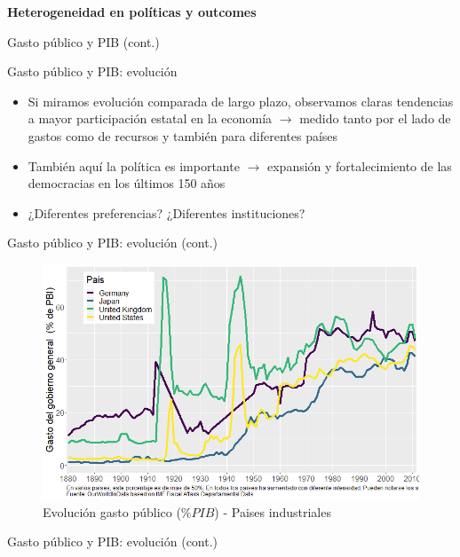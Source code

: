 \documentclass[
  ignorenonframetext,
]{beamer}
\providecommand{\tightlist}{%
  \setlength{\itemsep}{0pt}\setlength{\parskip}{0pt}}\usepackage{longtable,booktabs,array}
\begin{document}
\begin{frame}{\textbf{Heterogeneidad en políticas y outcomes}}
\begin{block}{Gasto público y PIB (cont.)}
\begin{figure}
\end{figure}
\end{block}

\begin{block}{Gasto público y PIB: evolución}
\protect\hypertarget{gasto-puxfablico-y-pib-evoluciuxf3n}{}
\begin{itemize}
\tightlist
\item
  Si miramos evolución comparada de largo plazo, observamos claras
  tendencias a mayor participación estatal en la economía
  \(\longrightarrow\) medido tanto por el lado de gastos como de
  recursos y también para diferentes países
\item
  También aquí la política es importante \(\longrightarrow\) expansión y
  fortalecimiento de las democracias en los últimos 150 años
\item
  ¿Diferentes preferencias? ¿Diferentes instituciones?
\end{itemize}
\end{block}

\begin{block}{Gasto público y PIB: evolución (cont.)}
\protect\hypertarget{gasto-puxfablico-y-pib-evoluciuxf3n-cont.}{}
\begin{figure}

{\centering \includegraphics{../epol/fig/fig-01-002.png}

}

\caption{Evolución gasto público (\(\%PIB\)) - Paises industriales}

\end{figure}
\end{block}

\begin{block}{Gasto público y PIB: evolución (cont.)}
\protect\hypertarget{gasto-puxfablico-y-pib-evoluciuxf3n-cont.-1}{}
\begin{figure}


\end{figure}
\end{block}
\end{frame}
\end{document}
